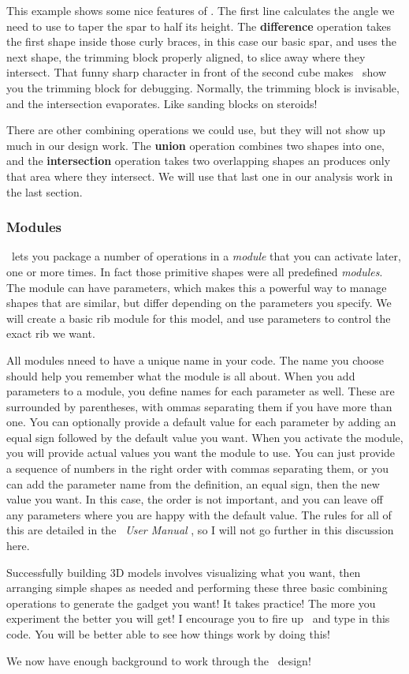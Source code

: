
This example shows some nice features of \osc. The first line calculates the
angle we need to use to taper  the spar to half its height. The {\bf
difference} operation takes the first shape inside those curly braces, in this
case our basic spar, and uses the next shape, the trimming block properly
aligned, to slice away where they intersect. That funny sharp character in front
of the second cube makes \osc\ show you the trimming block for debugging.
Normally, the trimming block is invisable, and the intersection evaporates.
Like sanding blocks on steroids!

There are other combining operations we could use, but they will not show up
much in our design work. The {\bf union} operation combines two shapes into
one, and the {\bf intersection} operation takes two overlapping shapes an
produces only that area where they intersect. We will use that last one in our
analysis work in the last section.


\subsubsection{Modules}

\osc\ lets you package a number of operations in a {\it module} that you can
activate later, one or more times. In fact those primitive shapes were all
predefined {\it modules}. The module can have parameters, which makes this a
powerful way to manage shapes that are similar, but differ depending on the
parameters you specify.  We will create a basic rib module for this model, and use parameters to control
the exact rib we want.

All modules nneed to have a unique name in your code.  The name you choose should help
you remember what the module is all about. When you add parameters to a module, you define names for each parameter as well. These are surrounded by
parentheses, with ommas separating them if you have more than one. You can
optionally provide a default value for each parameter by adding an equal sign
followed by the default value you want. When you activate the module, you will
provide actual values you want the module to use. You can just provide a
sequence of numbers in the right order with commas separating them, or you can
add the parameter name from the definition, an equal sign, then the new value
you want. In this case, the order is not important, and you can leave off any
parameters where you are happy with the default value.  The rules for all of
this are detailed in the \osc\ {\it User Manual} \cite{userman}, so I will
not go further in this discussion here.

Successfully building 3D models involves visualizing what you want, then
arranging simple shapes as needed and performing these three basic combining
operations to generate the gadget you want! It takes practice! The more you
experiment the better you will get! I encourage you to fire up \osc\ and type
in this code. You will be better able to see how things work by doing this!

We now have enough background to work through the \LPP\ design!
